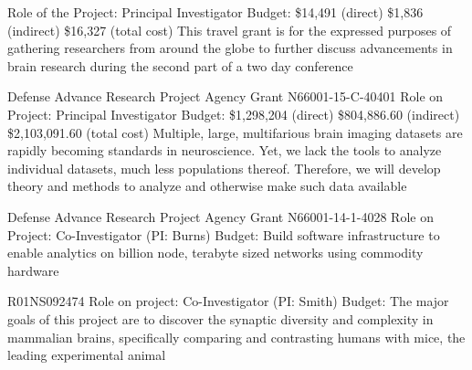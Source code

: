 \documentclass[10pt,colorlinks=true,urlcolor=blue]{moderncv}
\begin{document}
{\newline Role of the Project: Principal Investigator
\newline Budget: \$14,491 (direct) \$1,836 (indirect) \$16,327 (total cost)
\newline This travel grant is for the expressed purposes of gathering researchers from
around the globe to further discuss advancements in brain research during the
second part of a two day conference}{}{}{}{}

{\newline Defense Advance Research Project Agency Grant N66001-15-C-40401
\newline Role on Project: Principal Investigator
\newline Budget: \$1,298,204 (direct) \$804,886.60 (indirect) \$2,103,091.60 (total cost)
\newline Multiple, large, multifarious brain imaging datasets are rapidly becoming standards in
neuroscience. Yet, we lack the tools to analyze individual datasets, much less
populations thereof. Therefore, we will develop theory and methods to analyze and
otherwise make such data available}{}{}{}{}

{\newline Defense Advance Research Project Agency Grant N66001-14-1-4028
\newline Role on Project: Co-Investigator (PI: Burns)
\newline Budget:
\newline Build software infrastructure to enable analytics on billion node, terabyte sized networks
using commodity hardware}{}{}{}{}

{\newline R01NS092474
\newline Role on project: Co-Investigator (PI: Smith)
\newline Budget:
\newline The major goals of this project are to discover the synaptic diversity and complexity in
mammalian brains, specifically comparing and contrasting humans with mice, the leading
experimental animal}{}{}{}{}
\end{document}
